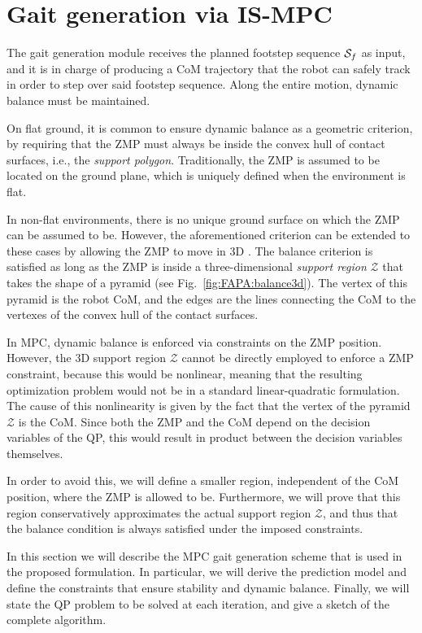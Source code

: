 \chapter{Gait generation via IS-MPC}
\label{sec:FAPA:GaitGeneration}
The gait generation module receives the planned footstep sequence ${\cal S}_f$ as input, and it is in charge of producing a CoM trajectory that the robot can safely track in order to step over said footstep sequence. Along the entire motion, dynamic balance must be maintained.

On flat ground, it is common to ensure dynamic balance as a geometric criterion, by requiring that the ZMP must always be inside the convex hull of contact surfaces, i.e., the \emph{support polygon}. Traditionally, the ZMP is assumed to be located on the ground plane, which is uniquely defined when the environment is flat.

In non-flat environments, there is no unique ground surface on which the ZMP can be assumed to be. However, the aforementioned criterion can be extended to these cases by allowing the ZMP to move in 3D \cite{SuImYaCa:2021}. The balance criterion is satisfied as long as the ZMP is inside a three-dimensional \emph{support region} $\mathcal{Z}$ that takes the shape of a pyramid (see Fig.~\ref{fig:FAPA:balance3d}). The vertex of this pyramid is the robot CoM, and the edges are the lines connecting the CoM to the vertexes of the convex hull of the contact surfaces.

In MPC, dynamic balance is enforced via constraints on the ZMP position. However, the 3D support region $\mathcal{Z}$ cannot be directly employed to enforce a ZMP constraint, because this would be nonlinear, meaning that the resulting optimization problem would not be in a standard linear-quadratic formulation. The cause of this nonlinearity is given by the fact that the vertex of the pyramid $\mathcal{Z}$ is the CoM. Since both the ZMP and the CoM depend on the decision variables of the QP, this would result in product between the decision variables themselves.

In order to avoid this, we will define a smaller region, independent of the CoM position, where the ZMP is allowed to be. Furthermore, we will prove that this region conservatively approximates the actual support region $\mathcal{Z}$, and thus that the balance condition is always satisfied under the imposed constraints.

In this section we will describe the MPC gait generation scheme that is used in the proposed formulation. In particular, we will derive the prediction model and define the constraints that ensure stability and dynamic balance. Finally, we will state the QP problem to be solved at each iteration, and give a sketch of the complete algorithm.

